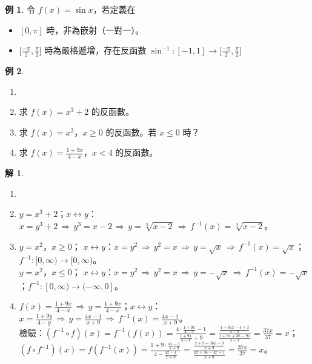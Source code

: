 \documentclass[12pt]{extarticle}
\newcommand{\ds}{\displaystyle}
\newcommand{\ie}{\,\Longrightarrow\,}
\theoremstyle{definition}
\newtheorem*{ex}{例}
\newtheorem*{sol}{解}
\newcommand{\myline}{\noindent\makebox[\linewidth]{\rule{\paperwidth}{0.4pt}}}
\begin{document}
\myline

\begin{ex}
  令 $f(x) = \sin x$，若定義在
  \begin{itemize}\setlength\itemsep{0em}
    \item $[0, \pi]$ 時，非為嵌射（一對一）。
    \item $\big[\frac{-\pi}{2}, \frac{\pi}{2}\big]$ 時為嚴格遞增，存在反函數 $\sin^{-1}:[-1, 1]\to\big[\frac{-\pi}{2}, \frac{\pi}{2}\big]$
  \end{itemize}
\end{ex}

\begin{ex}
  \begin{enumerate}\setlength\itemsep{0em}
    \item[]
    \item 求 $f(x) = x^3 + 2$ 的反函數。
    \item 求 $f(x) = x^2$，$x\geqslant 0$ 的反函數。若 $x\leqslant 0$ 時？
    \item 求 $\ds f(x) = \frac{1 + 9 x}{4 - x}$，$x < 4$ 的反函數。
  \end{enumerate}
\end{ex}

\begin{sol} 
  \begin{enumerate}\setlength\itemsep{0em}
    \item[]
    \item $y = x^3 + 2$；$x\longleftrightarrow y$：$x = y^3 + 2 \ie y^3 = x - 2 \ie y = \sqrt[3]{x - 2} \ie f^{-1}(x) = \sqrt[3]{x - 2}$。 
    \item $y = x^2$，$x\geqslant 0$； $x\longleftrightarrow y$：$x = y^2 \ie y^2 = x \ie y = \sqrt{x} \ie f^{-1}(x) = \sqrt{x}$；$f^{-1}:[0, \infty)\to [0, \infty)$。\\$y = x^2$，$x\leqslant 0$； $x\longleftrightarrow y$：$x = y^2 \ie y^2 = x \ie y = -\sqrt{x} \ie f^{-1}(x) = -\sqrt{x}$；$f^{-1}:[0, \infty)\to (-\infty, 0]$。
    \item $\ds f(x) = \frac{1 + 9x}{4 - x} \ie y = \frac{1 + 9x}{4 - x}$；$x\longleftrightarrow y$：$\ds x = \frac{1 + 9 y}{4 - y} \ie y = \frac{4 x - 1}{x + 9} \ie f^{-1}(x) = \frac{4 x - 1}{x + 9}$。\\
      檢驗：$\ds (f^{-1}\circ f)(x) = f^{-1}(f(x)) = \frac{4\cdot\frac{1 + 9x}{4 - x} - 1}{\frac{1 + 9x}{4 - x} + 9} = \frac{\frac{4 + 36 x - 4 + x}{4 - x}}{\frac{1 + 9x + 36 - 9x}{4 - x}} = \frac{37 x}{37} = x$；$\ds(f\circ f^{-1})(x) = f(f^{-1}(x)) = \frac{1 + 9\cdot\frac{4x - 1}{x + 9}}{4 - \frac{4 x - 1}{x + 9}} = \frac{\frac{x + 9 + 36 x - 9}{x + 9}}{\frac{4 x + 36 - 4x + 1}{x + 9}} = \frac{37x}{37} = x$。
  \end{enumerate}
\end{sol}
\end{document}
